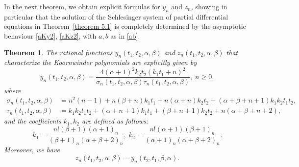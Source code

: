 \documentclass[10pt, reqno]{amsart}
\numberwithin{equation}{section}
\newtheorem{theorem}{Theorem}[section]
\numberwithin{equation}{section}
\begin{document}
In the next theorem, we obtain explicit formulas for $y_n$ and $z_n$, showing in particular that the solution of the Schlesinger system of partial differential equations in Theorem~\ref{theorem 5.1} is completely determined by the asymptotic behaviour \eqref{aKy2}, \eqref{aKz2}, with $a,b$ as in \eqref{ab}.
\begin{theorem} \label{theorem 5.2}
The rational functions $y_n(t_1,t_2,\alpha,\beta)$ and $z_n(t_1,t_2,\alpha,\beta)$ that characterize the Koornwinder polynomials are explicitly given by
\begin{equation} 
y_n(t_1,t_2,\alpha,\beta)=\frac{4(\alpha+1)^2k_2t_2(k_1t_1+n)^2}{\sigma_n(t_1,t_2,\alpha,\beta)\tau_n(t_1,t_2,\alpha,\beta)},\; n\geq 0,\label{Ky}
\end{equation}
where 
\begin{align}
\sigma_n(t_1,t_2,\alpha,\beta)&=n^2(n-1)+n(\beta+n)k_1t_1+n(\alpha+n)k_2t_2
+(\alpha+\beta+n+1)k_1k_2t_1t_2,\nonumber\\
\tau_n(t_1,t_2,\alpha,\beta)&=k_1k_2t_1t_2+(\alpha+n+1)k_1t_1+(\beta+n+1)k_2t_2
+n(\alpha+\beta+n+2),\label{Ksigmatau}
\end{align}
and the coefficients $k_1, k_2$ are defined as follows:
\begin{equation} \label{k1k2}
k_1=\frac{n!(\beta+1)(\alpha+1)_n}{(\beta+1)_n(\alpha+\beta+2)_n},\; k_2=\frac{n!(\alpha+1)(\beta+1)_n}{(\alpha+1)_n(\alpha+\beta+2)_n}.
\end{equation}
Moreover, we have
\begin{equation}
z_n(t_1,t_2,\alpha,\beta)=y_n(t_2,t_1,\beta,\alpha).\label{Kz}
\end{equation}
\end{theorem}
\end{document}

